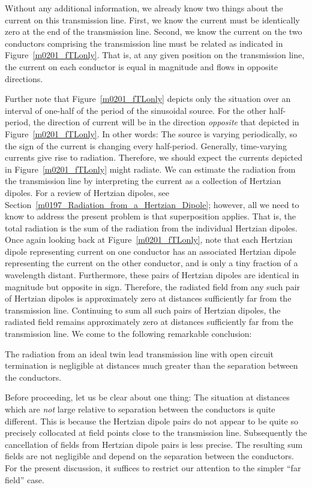 Without any additional information, we already know two things about the current on this transmission line.
First, we know the current must be identically zero at the end of the transmission line.
Second, we know the current on the two conductors comprising the transmission line must be related as indicated in Figure~\ref{m0201_fTLonly}.
That is, at any given position on the transmission line, the current on each conductor is equal in magnitude and flows in opposite directions.

Further note that Figure~\ref{m0201_fTLonly} depicts only the situation over an interval of one-half of the period of the sinusoidal source.  For the other half-period, the direction of current will be in the direction \emph{opposite} that depicted in Figure~\ref{m0201_fTLonly}.  
In other words: The source is varying periodically, so the sign of the current is changing every half-period.
Generally, time-varying currents give rise to radiation.
Therefore, we should expect the currents depicted in Figure~\ref{m0201_fTLonly} might radiate.
We can estimate the radiation from the transmission line by interpreting the current as a collection of Hertzian dipoles.
For a review of Hertzian dipoles, see Section~\ref{m0197_Radiation_from_a_Hertzian_Dipole}; however, all we need to know to address the present problem is that superposition 
applies.  That is, the total radiation is the sum of the radiation from the individual Hertzian dipoles.
Once again looking back at Figure~\ref{m0201_fTLonly}, note that each Hertzian dipole representing current on one conductor has an associated Hertzian dipole representing the current on the other conductor, and is only a tiny fraction of a wavelength distant.   Furthermore, these pairs of Hertzian dipoles are identical in magnitude but opposite in sign.
Therefore, the radiated field from any such pair of Hertzian dipoles is approximately zero at distances sufficiently far from the transmission line.
Continuing to sum all such pairs of Hertzian dipoles, the radiated field remains approximately zero at distances sufficiently far from the transmission line.
We come to the following remarkable conclusion:
%
\begin{mdframed}[backgroundcolor=yellow!20,nobreak=true] 
The radiation from an ideal twin lead transmission line with open circuit termination is negligible at distances much greater than the separation between the conductors.
\end{mdframed}
%
Before proceeding, let us be clear about one thing: 
The situation at distances which are \emph{not} large relative to separation between the conductors is quite different. 
This is because the Hertzian dipole pairs do not appear to be quite so precisely collocated at field points close to the transmission line.  
Subsequently the cancellation of fields from Hertzian dipole pairs is less precise.
The resulting sum fields are not negligible and depend on the separation between the conductors.  
For the present discussion, it suffices to restrict our attention to the simpler ``far field'' 
case.

